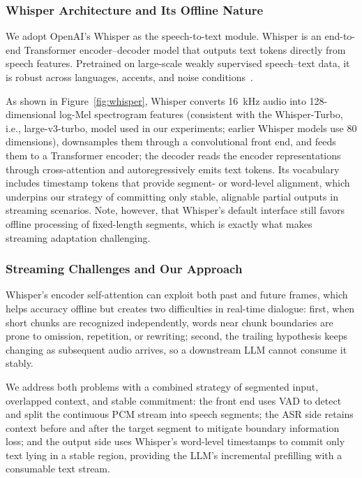 \documentclass[a4paper,11pt]{article}
\begin{document}
\subsubsection{Whisper Architecture and Its Offline Nature}

We adopt OpenAI's Whisper as the speech-to-text module. Whisper is an end-to-end Transformer encoder--decoder model that outputs text tokens directly from speech features. Pretrained on large-scale weakly supervised speech--text data, it is robust across languages, accents, and noise conditions~\cite{ref12}.

As shown in Figure~\ref{fig:whisper}, Whisper converts 16~kHz audio into 128-dimensional log-Mel spectrogram features (consistent with the Whisper-Turbo, i.e., large-v3-turbo, model used in our experiments; earlier Whisper models use 80 dimensions), downsamples them through a convolutional front end, and feeds them to a Transformer encoder; the decoder reads the encoder representations through cross-attention and autoregressively emits text tokens. Its vocabulary includes timestamp tokens that provide segment- or word-level alignment, which underpins our strategy of committing only stable, alignable partial outputs in streaming scenarios. Note, however, that Whisper's default interface still favors offline processing of fixed-length segments, which is exactly what makes streaming adaptation challenging.

\subsubsection{Streaming Challenges and Our Approach}

Whisper's encoder self-attention can exploit both past and future frames, which helps accuracy offline but creates two difficulties in real-time dialogue: first, when short chunks are recognized independently, words near chunk boundaries are prone to omission, repetition, or rewriting; second, the trailing hypothesis keeps changing as subsequent audio arrives, so a downstream LLM cannot consume it stably.

We address both problems with a combined strategy of segmented input, overlapped context, and stable commitment: the front end uses VAD to detect and split the continuous PCM stream into speech segments; the ASR side retains context before and after the target segment to mitigate boundary information loss; and the output side uses Whisper's word-level timestamps to commit only text lying in a stable region, providing the LLM's incremental prefilling with a consumable text stream.
\end{document}
